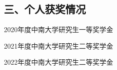 \vspace{22pt}

\vspace{22pt}
\subsection*{三、个人获奖情况}
\begin{enumerate}[label={[\arabic*]},itemindent=2em,wide]
	\item 2020年度中南大学研究生一等奖学金
	\item 2021年度中南大学研究生二等奖学金
	\item 2022年度中南大学研究生二等奖学金
\end{enumerate}
\fi


\ifblindreview
\else

{~}
\vspace{18pt}

\newpage

